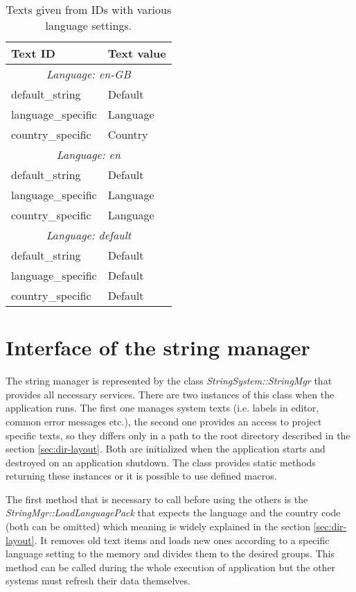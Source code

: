 \begin{table}[htbp]
  \begin{center}
	\begin{tabular}{|l|l|}
	\hline
	Text ID & Text value\\
	\hline
	\multicolumn{2}{|c|}{\emph{Language: en-GB}}\\
	\hline
	default\_string & Default\\
	language\_specific & Language\\
	country\_specific & Country\\
	\hline
	\multicolumn{2}{|c|}{\emph{Language: en}}\\
	\hline
	default\_string & Default\\
	language\_specific & Language\\
	country\_specific & Language\\
	\hline
	\multicolumn{2}{|c|}{\emph{Language: default}}\\
	\hline
	default\_string & Default\\
	language\_specific & Default\\
	country\_specific & Default\\
	\hline
	\end{tabular}
	\caption{Texts given from IDs with various language settings.}
	\label{tab:dir-layout}
	\end{center}
\end{table}

\section{Interface of the string manager}

The string manager is represented by the class \emph{StringSystem::StringMgr} that provides all necessary services. There are two instances of this class when the application runs. The first one manages system texts (i.e. labels in editor, common error messages etc.), the second one provides an access to project specific texts, so they differs only in a path to the root directory described in the section \ref{sec:dir-layout}. Both are initialized when the application starts and destroyed on an application shutdown. The class provides static methods returning these instances or it is possible to use defined macros.

The first method that is necessary to call before using the others is the \emph{StringMgr::LoadLanguagePack} that expects the language and the country code (both can be omitted) which meaning is widely explained in the section \ref{sec:dir-layout}. It removes old text items and loads new ones according to a specific language setting to the memory and divides them to the desired groups. This method can be called during the whole execution of application but the other systems must refresh their data themselves.


